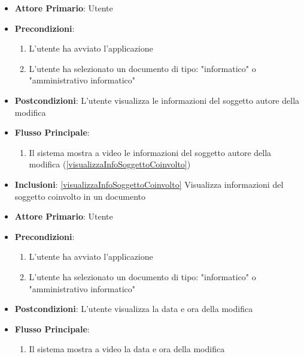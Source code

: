 \begin{itemize}
    \item \textbf{Attore Primario}: Utente
    \item \textbf{Precondizioni}:
    \begin{enumerate}
        \item L'utente ha avviato l'applicazione
        \item L'utente ha selezionato un documento di tipo: "informatico" o "amministrativo informatico"
    \end{enumerate}
    \item \textbf{Postcondizioni}: L'utente visualizza le informazioni del soggetto autore della modifica
    \item \textbf{Flusso Principale}:
        \begin{enumerate}
        \item Il sistema mostra a video le informazioni del soggetto autore della modifica (\ref{visualizzaInfoSoggettoCoinvolto})
    \end{enumerate}
    \item \textbf{Inclusioni}: \ref{visualizzaInfoSoggettoCoinvolto} Visualizza informazioni del soggetto coinvolto in un documento
\end{itemize}

\begin{itemize}
    \item \textbf{Attore Primario}: Utente
    \item \textbf{Precondizioni}:
    \begin{enumerate}
        \item L'utente ha avviato l'applicazione
        \item L'utente ha selezionato un documento di tipo: "informatico" o "amministrativo informatico"
    \end{enumerate}
    \item \textbf{Postcondizioni}: L'utente visualizza la data e ora della modifica
    \item \textbf{Flusso Principale}:
        \begin{enumerate}
        \item Il sistema mostra a video la data e ora della modifica
        \end{enumerate}
\end{itemize}

